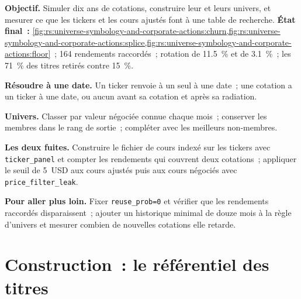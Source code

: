 \begin{tutorial}
\textbf{Objectif.} Simuler dix ans de cotations, construire leur  et leurs univers, et mesurer ce que les tickers et les cours ajustés
font à une table de recherche. \textbf{État final~:} \cref{fig:rs:universe-symbology-and-corporate-actions:churn,fig:rs:universe-symbology-and-corporate-actions:splice,fig:rs:universe-symbology-and-corporate-actions:floor}~;
164 rendements raccordés~; rotation de 11.5~\% et de 3.1~\%~; les 71~\% des titres retirés contre 15~\%.
\begin{tutsteps}
\item \textbf{Résoudre à une date.} Un ticker renvoie à un seul  à une date~; une cotation a un ticker à une date,
ou aucun avant sa cotation et après sa radiation.
\label{lst:rs:universe-symbology-and-corporate-actions:resolve}
\item \textbf{Univers.} Classer par valeur négociée connue chaque mois~; conserver les membres dans le rang de sortie~; compléter avec les meilleurs
non-membres.
\label{lst:rs:universe-symbology-and-corporate-actions:buffer}
\item \textbf{Les deux fuites.} Construire le fichier de cours indexé sur les tickers avec \texttt{ticker\_panel} et compter les rendements qui couvrent deux
cotations~; appliquer le seuil de 5~USD aux cours ajustés puis aux cours négociés avec \texttt{price\_filter\_leak}.
\end{tutsteps}
\textbf{Pour aller plus loin.} Fixer \texttt{reuse\_prob=0} et vérifier que les rendements raccordés disparaissent~; ajouter un historique minimal de
douze mois à la règle d'univers et mesurer combien de nouvelles cotations elle retarde.
\end{tutorial}

\section{Construction~: le référentiel des titres}\label{bld:rs:universe-symbology-and-corporate-actions:secmaster}

